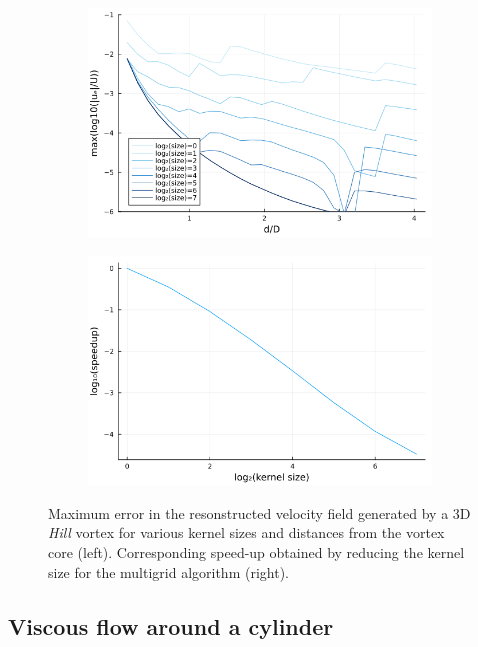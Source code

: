 \documentclass{article}
\begin{document}
\begin{figure}
    \centering
    \begin{subfigure}{.5\textwidth}
        \centering
        \includegraphics[width=\textwidth]{tex//fig/Hill_error_dists.png}
    \end{subfigure}%
    \begin{subfigure}{.5\textwidth}
        \centering
        \includegraphics[width=\textwidth]{tex/fig/Hill_speedup_dists.png}
    \end{subfigure}
    \caption{Maximum error in the resonstructed velocity field generated by a 3D \emph{Hill} vortex for various kernel sizes and distances from the vortex core (left). Corresponding speed-up obtained by reducing the kernel size for the multigrid algorithm (right).}
    \label{fig:error_hill_3}
\end{figure}

\subsection{Viscous flow around a cylinder}
\end{document}
